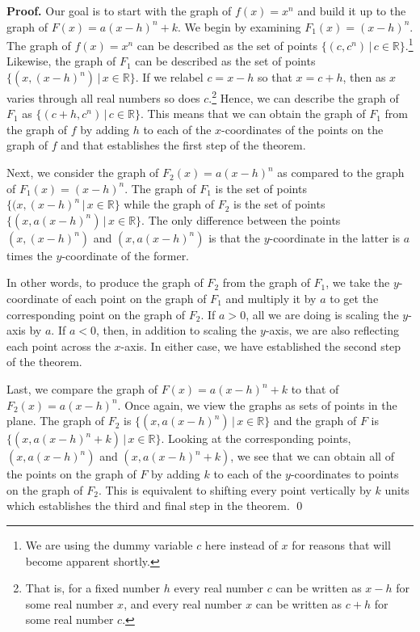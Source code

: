 \medskip

{\bf Proof.} Our goal is to start with the graph of $f(x) = x^n$ and build it up to the graph of $F(x) = a(x-h)^n+k$.  We begin by examining $F_{1}(x) = (x-h)^n$.  The graph of $f(x) = x^n$ can be described as the set of points $\{ (c, c^n) \, | \, c \in \mathbb{R} \}$.\footnote{We are using the dummy variable $c$ here instead of $x$ for reasons that will become apparent shortly.}  Likewise, the graph of $F_{1}$ can be described as the set of points $\{(x, (x-h)^n) \, | \, x \in \mathbb{R} \}$.   If we relabel $c =x-h$ so that $x = c+h$, then as $x$ varies through all real numbers so does $c$.\footnote{That is, for a fixed number $h$ every real number $c$ can be written as $x-h$ for some real number $x$, and every real number $x$ can be written as $c + h$ for some real number $c$.}   Hence, we can describe the graph of $F_{1}$ as $\{ (c+h, c^n) \, | \, c \in \mathbb{R} \}$. This means that we can obtain the graph of $F_{1}$ from the graph of $f$ by adding $h$ to each of the $x$-coordinates of the points on the graph of $f$ and that establishes the first step of the theorem.

\medskip

Next, we consider the graph of $F_{2}(x) = a(x-h)^n$ as compared to the graph of $F_{1}(x) = (x-h)^n$.  The graph of $F_{1}$ is the set of points $\{ (x, (x-h)^n \, | \, x \in \mathbb{R} \}$ while the graph of $F_{2}$ is the set of points $\{ (x, a(x-h)^n) \, | \, x \in \mathbb{R} \}$.  The only difference between the points $(x, (x-h)^n)$ and $(x, a(x-h)^n)$ is that the $y$-coordinate in the latter is $a$ times the $y$-coordinate of the former.  

\medskip

In other words, to produce the graph of $F_{2}$ from the graph of $F_{1}$, we take the $y$-coordinate of each point on the graph of $F_{1}$ and multiply it by $a$ to get the corresponding point on the graph of $F_{2}$.  If $a>0$, all we are doing is scaling the $y$-axis by $a$.  If $a<0$, then, in addition to scaling the $y$-axis, we are also reflecting each point across the $x$-axis.  In either case, we have established the second step of the theorem.

\medskip

Last, we compare the graph of $F(x) = a(x-h)^n + k$ to that of $F_{2}(x) = a(x-h)^n$.  Once again, we view the graphs as sets of points in the plane.  The graph of $F_{2}$ is $\{ (x, a(x-h)^n) \, | \, x \in \mathbb{R} \}$ and the graph of $F$ is$\{ (x, a(x-h)^n+k) \, | \, x \in \mathbb{R} \}$.  Looking at the corresponding points, $(x, a(x-h)^n)$ and $(x, a(x-h)^n+k)$, we see that we can obtain all of the points on the graph of $F$ by adding $k$ to each of the $y$-coordinates to points on the graph of $F_{2}$. This is equivalent to  shifting every point vertically by $k$ units which establishes the third and final step in the theorem. \qed

